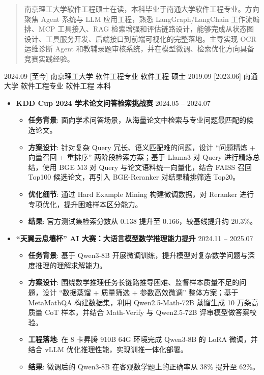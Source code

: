\documentclass[zh]{resume}
\begin{document}
\makeheader

\begin{abstract}
南京理工大学软件工程硕士在读，本科毕业于南通大学软件工程专业。方向聚焦 Agent 系统与 LLM 应用工程，熟悉 LangGraph/LangChain 工作流编排、MCP 工具接入、RAG 检索增强和评估链路设计，能够完成从状态图设计、工具服务开发、后端接口到前端可视化的完整落地。主导实现 OCR 运维诊断 Agent 和教辅录题审核系统，并在模型微调、检索优化方向具备竞赛实践经验。
\end{abstract}

\begin{educations}
  \education%
    {2024.09}%
    [至今]%
    {南京理工大学}%
    {软件工程专业}%
    {软件工程}%
    {硕士}
  \separator{0.5ex}
  \education%
    {2019.09}%
    [2023.06]%
    {南通大学}%
    {软件工程专业}%
    {软件工程}%
    {本科}
\end{educations}

\begin{itemize}
  \item \textbf{KDD Cup 2024 学术论文问答检索挑战赛} \hfill 2024.05 -- 2024.07
  \begin{itemize}
    \item \textbf{任务背景}: 面向学术问答场景，从海量论文中检索与专业问题最匹配的候选论文。
    \item \textbf{方案设计}: 针对复杂 Query 冗长、语义匹配难的问题，设计 ``问题精炼 + 向量召回 + 重排序'' 两阶段检索方案；基于 Llama3 对 Query 进行精炼总结，使用 BGE M3 对 Query 与论文语料统一向量化，结合 FAISS 召回 Top100 候选论文，再引入 BGE-Reranker 对结果精排筛选 Top20。
    \item \textbf{优化细节}: 通过 Hard Example Mining 构建微调数据，对 Reranker 进行专项优化，提升困难样本区分能力。
    \item \textbf{结果}: 官方测试集检索分数从 0.138 提升至 0.166，较基线提升约 20.3\%。
  \end{itemize}

  \item \textbf{``天翼云息壤杯'' AI 大赛：大语言模型数学推理能力提升} \hfill 2024.11 -- 2025.07
  \begin{itemize}
    \item \textbf{任务背景}: 基于 Qwen3-8B 开展微调训练，提升模型对复杂数学问题与深度推理的理解求解能力。
    \item \textbf{方案设计}: 围绕数学推理任务长链路推导困难、监督样本质量不足的问题，设计 ``数据蒸馏 + 质量筛选 + 参数高效微调'' 整体方案；基于 MetaMathQA 构建数据集，利用 Qwen2.5-Math-72B 蒸馏生成 10 万条高质量 CoT 样本，并结合 Math-Verify 与 Qwen2.5-72B 评审模型做答案校验。
    \item \textbf{工程落地}: 在 8 卡昇腾 910B 64G 环境完成 Qwen3-8B 的 LoRA 微调，并结合 vLLM 优化推理性能，实现训推一体化部署。
    \item \textbf{结果}: 微调后的 Qwen3-8B 在客观数学题上的正确率从 38\% 提升至 62\%。
  \end{itemize}
\end{itemize}
\end{document}
